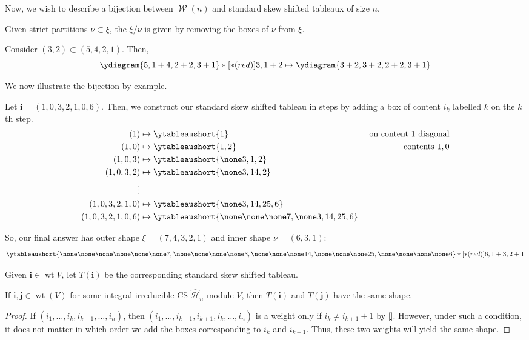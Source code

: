 \documentclass[11pt,leqno,oneside]{amsbook}
\renewcommand{\H}{\mathcal{H}}
\DeclareMathOperator{\wt}{wt}
\DeclareMathOperator{\wts}{\mathcal{W}}
\renewcommand{\vec}[1]{\mathbf{#1}}
\numberwithin{thm}{section}
\begin{document}
Now, we wish to describe a bijection between \(\wts(n)\) and
standard skew shifted tableaux of size \(n\).
\begin{defn}
    Given strict partitions \(\nu \subset \xi\), the  \(\xi/\nu\) is given by removing the boxes of
    \(\nu\) from \(\xi\).
\end{defn}
\begin{example}
  Consider \((3,2) \subset (5,4,2,1)\). Then, \[
    \ydiagram{5,1+4,2+2,3+1}*[*(red)]{3,1+2} \mapsto \ydiagram{3+2,3+2,2+2,3+1}
  \]
\end{example}
We now illustrate the bijection by example.
\begin{example}
  Let \(\vec{i} = (1,0,3,2,1,0,6)\). Then, we construct our standard skew
  shifted tableau in steps by adding a box of content \(i_k\) labelled
  \(k\) on the \(k\)th step.
  \begin{align*}
    (1) & \mapsto \ytableaushort{1} & \text{ on content }1\text{
                                      diagonal}\\
    (1,0) & \mapsto \ytableaushort{1,2} & \text{ contents }1,0\\
    (1,0,3) & \mapsto \ytableaushort{\none3,1,2}\\
    (1,0,3,2) & \mapsto \ytableaushort{\none3,14,2}\\
    \vdots\\
    (1,0,3,2,1,0) & \mapsto \ytableaushort{\none3,14,25,6}\\
    (1,0,3,2,1,0,6) & \mapsto \ytableaushort{\none\none\none7,\none3,14,25,6}
  \end{align*}
\end{example}
So, our final answer has outer shape \(\xi = (7,4,3,2,1)\) and inner
shape \(\nu = (6,3,1)\):\[
  \ytableaushort{\none\none\none\none\none\none7,\none\none\none\none3,\none\none\none14,\none\none\none25,\none\none\none\none6}*[*(red)]{6,1+3,2+1}
\]
\begin{defn}
  Given \(\vec{i} \in \wt V\), let \(T(\vec{i})\) be the corresponding
  standard skew shifted tableau. 
\end{defn}
\begin{prop}
  If \(\vec{i},\vec{j} \in \wt(V)\) for some integral irreducible CS
  \(\hat{\H}_n\)-module \(V\), then \(T(\vec{i})\) and \(T(\vec{j})\)
  have the same shape.
\end{prop}
\begin{proof}
  If \((i_1, \ldots, i_k, i_{k+1}, \ldots, i_n)\), then \((i_1, \ldots,
  i_{k-1}, i_{k+1}, i_k, \ldots, i_n)\) is a weight only if \(i_k \neq
  i_{k+1} \pm 1\) by \ref{}. However, under such a condition, it does 
  not matter 
  in which order we add the boxes corresponding to \(i_k\) and
  \(i_{k+1}\). Thus, these two weights will yield the same shape.
\end{proof}
\end{document}
